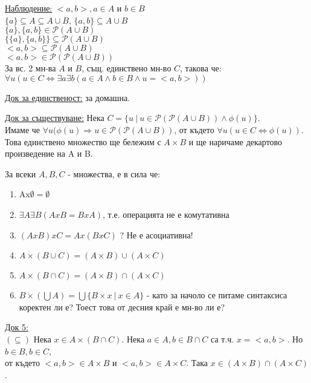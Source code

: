 \documentclass[fleqn, titlepage, 12pt]{report}
\begin{document}
\underline{Наблюдение:} $ <a,b>, a \in A$ и $b \in B$\\
$ \{ a\} \subseteq  A \subseteq A \cup B$, $ \{ a,b\} \subseteq A \cup B$\\
$ \{ a\}, \{ a, b\} \in \mathcal{P}(A \cup B) $\\
$ \{ \{ a\}, \{ a,b\}\} \subseteq \mathcal{P}(A \cup B) $ \\
$ <a,b> \subseteq \mathcal{P}(A \cup B) $ \\
$ <a,b> \in \mathcal{P}( \mathcal{P} (A \cup B)) $ \\

\bigbreak
{} За вс. 2 мн-ва $A$ и $B$, същ. единствено мн-во $C$, такова че:\\
$ \forall{u} (u \in C \Leftrightarrow \exists{a} \exists{b} (a \in A \land b \in B \land u = <a,b>))$
\bigbreak

\underline{Док за единственост:} за домашна.
\bigbreak

\underline{Док за съществуване:} Нека $C = \{u\ |\ u \in \mathcal{P}( \mathcal{P}(A \cup B) ) \land \phi(u)\} $.\\
Имаме че $ \forall{u} ( \phi(u) \Rightarrow u \in \mathcal{P}( \mathcal{P}(A \cup B) )$, от където
$ \forall{u} (u \in C \Leftrightarrow \phi(u) )$.
Това единствено множество ще бележим с $A \times B$ и ще наричаме декартово произведение на A и B.
\bigbreak

 За всеки $A, B, C$ - множества, е в сила че:
\begin{enumerate}
  \item Ax$\emptyset = \emptyset $
  \item $ \exists{A} \exists{B} (AxB = BxA)$, т.е. операцията не е комутативна
  \item $(AxB)xC = Ax(BxC)$ ? Не е асоциативна!
  \item $A \times (B \cup C) = (A \times B) \cup (A \times C)$
  \item $A \times (B \cap C) = (A \times B) \cap (A \times C)$
  \item $B \times (\bigcup A) = \bigcup \{ B \times x\ |\ x \in A\}$ - като за начоло се питаме синтаксиса коректен ли е?
    Тоест това от десния край е мн-во ли е?
\end{enumerate}
\bigbreak

\underline{Док 5:}\\
$(\subseteq)$ Нека $x \in A \times (B \cap C )$. Нека $a \in A, b \in B \cap C$ са т.ч.
$x = <a,b>$. Но $b \in B, b \in C$,\\ от където $<a,b> \in A \times B$ и $<a,b> \in A \times C$.
Така $x \in (A \times B) \cap (A \times C)$.
\bigbreak
\end{document}

